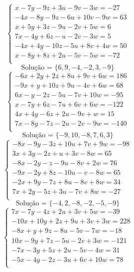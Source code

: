 \documentclass[12pt,oneside,a4paper]{article}
\begin{document}
\vspace{\baselineskip}
\begin{equation*}
\begin{cases}
x-7y-9z+3u-9v-3w=-27 \\
-4x-8y-9z-6u+10v-9w=63 \\
x+5y+3z-9u-2v+5w=6 \\
7x-4y+6z-u-2v-3w=5 \\
-4x+4y-10z-5u+8v+4w=50 \\
x-8y+8z+2u-5v-5w=-72 \\
\end{cases}
\end{equation*}
\begin{equation*}
\text{Solução = }\{6,9,-4,-2,3,-9\}
\end{equation*}
\vspace{\baselineskip}
\begin{equation*}
\begin{cases}
-6x+2y+2z+8u+9v+6w=186 \\
-9x+y+10z+9u-4v+6w=68 \\
6x-y-2z-5u-7v+10w=-95 \\
x-7y+6z-7u+6v+6w=-122 \\
4x+4y-6z+2u-9v+w=15 \\
7x-8y-7z-2u-2v-9w=-140 \\
\end{cases}
\end{equation*}
\begin{equation*}
\text{Solução = }\{-9,10,-8,7,6,3\}
\end{equation*}
\vspace{\baselineskip}
\begin{equation*}
\begin{cases}
-8x-9y-3z+10u+7v+9w=-98 \\
3x+3y-2z+u+3v-8w=65 \\
-8x-2y-z-9u-8v+2w=76 \\
-9x-2y+8z-10u-v-8w=65 \\
-2x+9y-7z+8u-8v+8w=34 \\
7x+2y-5z+3u-7v+8w=-27 \\
\end{cases}
\end{equation*}
\begin{equation*}
\text{Solução = }\{-4,2,-8,-2,-5,-9\}
\end{equation*}
\vspace{\baselineskip}
\begin{equation*}
\begin{cases}
7x-7y-4z+2u+3v+5w=-39 \\
-10x+10y+2z+9u+3v+3w=228 \\
-8x+y+9z-8u-5v-7w=-18 \\
10x-9y+7z-5u-2v+3w=-121 \\
-7x-3y+5z+2u-5v-4w=31 \\
-5x-4y-2z-3u+6v+10w=78 \\
\end{cases}
\end{equation*}
\end{document}
